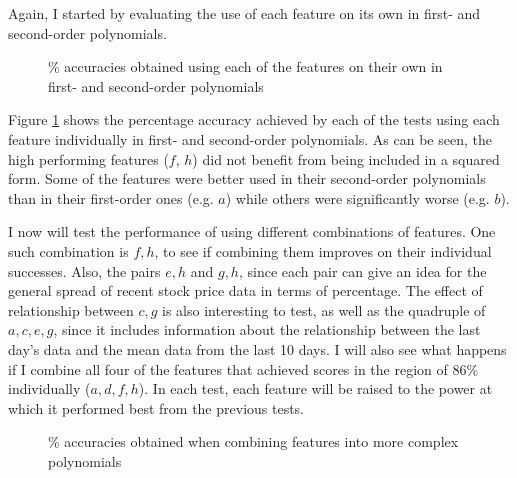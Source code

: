 \documentclass[a4paper,11pt]{article}
\begin{document}
Again, I started by evaluating the use of each feature on its own in first- and second-order polynomials.

\begin{figure}
\centering
\begin{bchart}[step=20,max=100]
		\smallskip
		\smallskip
		\smallskip
		\smallskip
		\smallskip
		\smallskip
		\smallskip
		\smallskip
		\smallskip
		\smallskip
		\smallskip
		\smallskip
		\smallskip
		\smallskip
		\smallskip
\end{bchart}
\caption{\% accuracies obtained using each of the features on their own in first- and second-order polynomials}
\label{task2onetwoorder}
\end{figure}

Figure \ref{task2onetwoorder} shows the percentage accuracy achieved by each of the tests using each feature individually in first- and second-order polynomials.  As can be seen, the high performing features ($f$, $h$) did not benefit from being included in a squared form.  Some of the features were better used in their second-order polynomials than in their first-order ones (e.g. $a$) while others were significantly worse (e.g. $b$).

I now will test the performance of using different combinations of features.  One such combination is $f,h$, to see if combining them improves on their individual successes.  Also, the pairs $e,h$ and $g,h$, since each pair can give an idea for the general spread of recent stock price data in terms of percentage.  The effect of relationship between $c,g$ is also interesting to test, as well as the quadruple of $a,c,e,g$, since it includes information about the relationship between the last day's data and the mean data from the last 10 days.  I will also see what happens if I combine all four of the features that achieved scores in the region of 86\%{} individually ($a,d,f,h$).  In each test, each feature will be raised to the power at which it performed best from the previous tests.

\begin{figure}
\centering
\begin{bchart}[step=20,max=100]
		\smallskip
		\smallskip
		\smallskip
		\smallskip
		\smallskip
		\smallskip
\end{bchart}
\caption{\% accuracies obtained when combining features into more complex polynomials}
\label{task2complex}
\end{figure}
\end{document}
